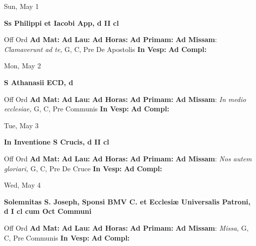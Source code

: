 \documentclass[10pt]{article}
\begin{document}
\begin{minipage}{3.5in}
\vspace{2em}\begin{center}
Sun, May 1
\end{center}\textbf{ \large Ss Philippi et Iacobi App, \textnormal{\normalsize d II cl}}
\begin{justify}
Off Ord
\textbf{Ad Mat: }
\textbf{Ad Lau: }
\textbf{Ad Horas: }
\textbf{Ad Primam: }
\textbf{Ad Missam}: \textit{Clamaverunt ad te,} G, C, Pre De Apostolis
\textbf{In Vesp: }
\textbf{Ad Compl: }\end{justify}
\end{minipage}



\begin{minipage}{3.5in}
\vspace{2em}\begin{center}
Mon, May 2
\end{center}\textbf{ \large S Athanasii ECD, \textnormal{\normalsize d}}
\begin{justify}
Off Ord
\textbf{Ad Mat: }
\textbf{Ad Lau: }
\textbf{Ad Horas: }
\textbf{Ad Primam: }
\textbf{Ad Missam}: \textit{In medio ecclesiae,} G, C, Pre Communis
\textbf{In Vesp: }
\textbf{Ad Compl: }\end{justify}
\end{minipage}



\begin{minipage}{3.5in}
\vspace{2em}\begin{center}
Tue, May 3
\end{center}\textbf{ \large In Inventione S Crucis, \textnormal{\normalsize d II cl}}
\begin{justify}
Off Ord
\textbf{Ad Mat: }
\textbf{Ad Lau: }
\textbf{Ad Horas: }
\textbf{Ad Primam: }
\textbf{Ad Missam}: \textit{Nos autem gloriari,} G, C, Pre De Cruce
\textbf{In Vesp: }
\textbf{Ad Compl: }\end{justify}
\end{minipage}



\begin{minipage}{3.5in}
\vspace{2em}\begin{center}
Wed, May 4
\end{center}\textbf{ \large Solemnitas S. Joseph, Sponsi BMV C. et Ecclesiæ Universalis Patroni, \textnormal{\normalsize d I cl cum Oct Communi}}
\begin{justify}
Off Ord
\textbf{Ad Mat: }
\textbf{Ad Lau: }
\textbf{Ad Horas: }
\textbf{Ad Primam: }
\textbf{Ad Missam}: \textit{Missa,} G, C, Pre Communis
\textbf{In Vesp: }
\textbf{Ad Compl: }\end{justify}
\end{minipage}
\end{document}
